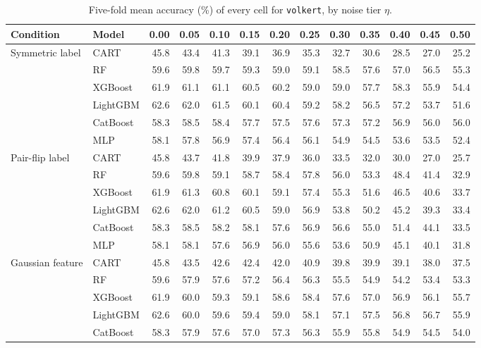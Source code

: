 \begin{table}[p]
\centering
\tiny
\setlength{\tabcolsep}{2.6pt}
\caption{Five-fold mean accuracy (\%) of every cell for \texttt{volkert}, by noise tier $\eta$.}
\label{tab:grid_volkert}
\begin{tabular}{@{}llrrrrrrrrrrr@{}}
\toprule
Condition & Model & 0.00 & 0.05 & 0.10 & 0.15 & 0.20 & 0.25 & 0.30 & 0.35 & 0.40 & 0.45 & 0.50 \\
\midrule
Symmetric label & CART & 45.8 & 43.4 & 41.3 & 39.1 & 36.9 & 35.3 & 32.7 & 30.6 & 28.5 & 27.0 & 25.2 \\
 & RF & 59.6 & 59.8 & 59.7 & 59.3 & 59.0 & 59.1 & 58.5 & 57.6 & 57.0 & 56.5 & 55.3 \\
 & XGBoost & 61.9 & 61.1 & 61.1 & 60.5 & 60.2 & 59.0 & 59.0 & 57.7 & 58.3 & 55.9 & 54.4 \\
 & LightGBM & 62.6 & 62.0 & 61.5 & 60.1 & 60.4 & 59.2 & 58.2 & 56.5 & 57.2 & 53.7 & 51.6 \\
 & CatBoost & 58.3 & 58.5 & 58.4 & 57.7 & 57.5 & 57.6 & 57.3 & 57.2 & 56.9 & 56.0 & 56.0 \\
 & MLP & 58.1 & 57.8 & 56.9 & 57.4 & 56.4 & 56.1 & 54.9 & 54.5 & 53.6 & 53.5 & 52.4 \\
\midrule
Pair-flip label & CART & 45.8 & 43.7 & 41.8 & 39.9 & 37.9 & 36.0 & 33.5 & 32.0 & 30.0 & 27.0 & 25.7 \\
 & RF & 59.6 & 59.8 & 59.1 & 58.7 & 58.4 & 57.8 & 56.0 & 53.3 & 48.4 & 41.4 & 32.9 \\
 & XGBoost & 61.9 & 61.3 & 60.8 & 60.1 & 59.1 & 57.4 & 55.3 & 51.6 & 46.5 & 40.6 & 33.7 \\
 & LightGBM & 62.6 & 62.0 & 61.2 & 60.5 & 59.0 & 56.9 & 53.8 & 50.2 & 45.2 & 39.3 & 33.4 \\
 & CatBoost & 58.3 & 58.5 & 58.2 & 58.1 & 57.6 & 56.9 & 56.6 & 55.0 & 51.4 & 44.1 & 33.5 \\
 & MLP & 58.1 & 58.1 & 57.6 & 56.9 & 56.0 & 55.6 & 53.6 & 50.9 & 45.1 & 40.1 & 31.8 \\
\midrule
Gaussian feature & CART & 45.8 & 43.5 & 42.6 & 42.4 & 42.0 & 40.9 & 39.8 & 39.9 & 39.1 & 38.0 & 37.5 \\
 & RF & 59.6 & 57.9 & 57.6 & 57.2 & 56.4 & 56.3 & 55.5 & 54.9 & 54.2 & 53.4 & 53.3 \\
 & XGBoost & 61.9 & 60.0 & 59.3 & 59.1 & 58.6 & 58.4 & 57.6 & 57.0 & 56.9 & 56.1 & 55.7 \\
 & LightGBM & 62.6 & 60.0 & 59.6 & 59.4 & 59.0 & 58.1 & 57.1 & 57.5 & 56.8 & 56.7 & 55.9 \\
 & CatBoost & 58.3 & 57.9 & 57.6 & 57.0 & 57.3 & 56.3 & 55.9 & 55.8 & 54.9 & 54.5 & 54.0 \\

\end{tabular}
\end{table}
